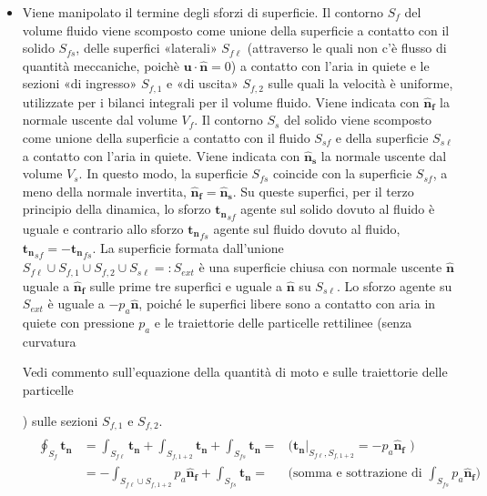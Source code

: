 \documentclass[letterpaper,10pt,italian]{jupyterBook}
\begin{document}
\begin{itemize}
\item {} 
\sphinxAtStartPar
Viene manipolato il termine degli sforzi di superficie. Il contorno
\(S_f\) del volume fluido viene scomposto come unione della superficie
a contatto con il solido \(S_{fs}\), delle superfici «laterali»
\(S_{f\ell}\) (attraverso le quali non c’è flusso di quantità
meccaniche, poichè \(\bm{u}\cdot\bm{\hat{n}} = 0\)) a contatto con
l’aria in quiete e le sezioni «di ingresso» \(S_{f,1}\) e «di uscita»
\(S_{f,2}\) sulle quali la velocità è uniforme, utilizzate per i
bilanci integrali per il volume fluido. Viene indicata con
\(\bm{\hat{n}_f}\) la normale uscente dal volume \(V_f\). Il contorno
\(S_s\) del solido viene scomposto come unione della superficie a
contatto con il fluido \(S_{sf}\) e della superficie \(S_{s\ell}\) a
contatto con l’aria in quiete. Viene indicata con \(\bm{\hat{n}_s}\)
la normale uscente dal volume \(V_s\). In questo modo, la superficie
\(S_{fs}\) coincide con la superficie \(S_{sf}\), a meno della normale
invertita, \(\bm{\hat{n}_f} = \bm{\hat{n}_s}\). Su queste superfici,
per il terzo principio della dinamica, lo sforzo \({\bm{t_n}}_{sf}\)
agente sul solido dovuto al fluido è uguale e contrario allo sforzo
\({\bm{t_n}}_{fs}\) agente sul fluido dovuto al fluido,
\({\bm{t_n}}_{sf}=-{\bm{t_n}}_{fs}\). La superficie formata
dall’unione
\(S_{f\ell} \cup S_{f,1} \cup S_{f,2} \cup S_{s\ell} =:S_{ext}\) è una
superficie chiusa con normale uscente \(\bm{\hat{n}}\) uguale a
\(\bm{\hat{n}_f}\) sulle prime tre superfici e uguale a \(\bm{\hat{n}}\)
su \(S_{s\ell}\). Lo sforzo agente su \(S_{ext}\) è uguale a
\(-p_a\bm{\hat{n}}\), poiché le superfici libere sono a contatto con
aria in quiete con pressione \(p_a\) e le traiettorie delle particelle
rettilinee (senza curvatura%
\begin{footnote}[1]\sphinxAtStartFootnote
Vedi commento sull’equazione della quantità di moto e sulle
traiettorie delle particelle
%
\end{footnote}) sulle sezioni \(S_{f,1}\) e
\(S_{f,2}\).
\begin{align*}\!\begin{aligned}
\begin{aligned}
      \oint_{S_f} \bm{t_n} & = 
      \int_{S_{f\ell}} \bm{t_n} + \int_{S_{f,1+2}} \bm{t_n} + \int_{S_{fs}} \bm{t_n} = & \text{($\bm{t_n} |_{S_{f\ell},S_{f,1+2}} = -p_a \bm{\hat{n}_f}$ )}\\
      & = - \int_{S_{f\ell}\cup S_{f,1+2}} p_a \bm{\hat{n}_f} + \int_{S_{fs}} \bm{t_n} = & \text{(somma e sottrazione di $\int_{S_{fs}} p_a \bm{\hat{n}_f}$)}\\

\end{aligned}
\end{aligned}
\end{align*}
\end{itemize}
\end{document}
